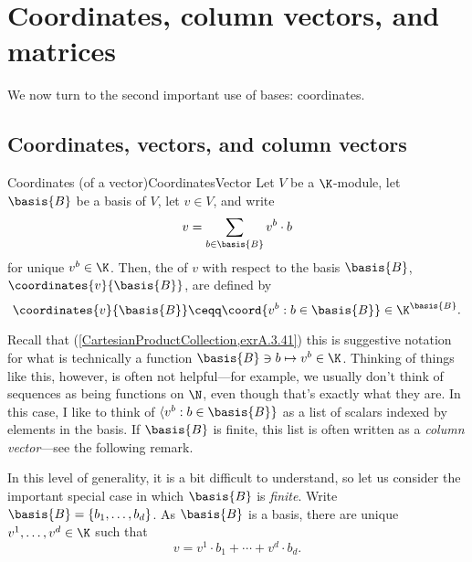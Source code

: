 \chapter[Coordinates, vectors, and matrices]{Coordinates, column vectors, and matrices}

We now turn to the second important use of bases:  coordinates.

\section{Coordinates, vectors, and column vectors}

\begin{dfn}{Coordinates (of a vector)}{CoordinatesVector}
	Let $V$ be a $\K$-module, let $\basis{B}$ be a basis of $V$, let $v\in V$, and write
	\begin{equation}
		v=\sum _{b\in \basis{B}}v^b\cdot b
	\end{equation}
	for unique $v^b\in \K$.  Then, the  of $v$ with respect to the basis $\basis{B}$, $\coordinates{v}{\basis{B}}$, are defined by
	\begin{equation}
		\coordinates{v}{\basis{B}}\ceqq \coord{v^b:b\in \basis{B}}\in \K ^{\basis{B}}.
	\end{equation}
	\begin{rmk}
		Recall that (\cref{CartesianProductCollection,exrA.3.41}) this is suggestive notation for what is technically a function $\basis{B}\ni b\mapsto v^b\in \K$.  Thinking of things like this, however, is often not helpful---for example, we usually don't think of sequences as being functions on $\N$, even though that's exactly what they are.  In this case, I like to think of $\langle v^b:b\in \basis{B}\}$ as a list of scalars indexed by elements in the basis.  If $\basis{B}$ is finite, this list is often written as a \emph{column vector}---see the following remark.
	\end{rmk}
	\begin{rmk}
		In this level of generality, it is a bit difficult to understand, so let us consider the important special case in which $\basis{B}$ is \emph{finite}.  Write $\basis{B}=\{ b_1,\ldots ,b_d\}$.  As $\basis{B}$ is a basis, there are unique $v^1,\ldots ,v^d\in \K$ such that
		\begin{equation}
			v=v^1\cdot b_1+\cdots +v^d\cdot b_d.
		\end{equation}

\end{rmk}
\end{dfn}
